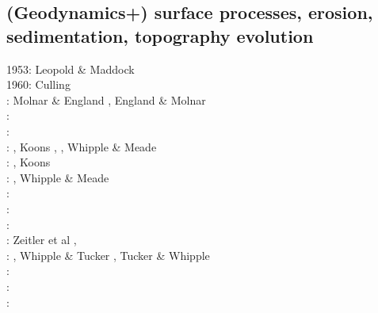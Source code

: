 \subsection{(Geodynamics+) surface processes, erosion, sedimentation, topography evolution}

\begin{scriptsize}
1953: Leopold \& Maddock \cite{lema53}\\
1960: Culling \cite{cull60}\\
\nineteenninety: Molnar \& England \cite{moen90}, England \& Molnar \cite{enmo90}\\
\nineteenninetytwo: \cite{befh92}\cite{chas92}\\
\nineteenninetythree: \cite{povp93}\cite{wibf93}\\
\nineteenninetyfour: \cite{howa94}, Koons \cite{koon94}, \cite{kobe94}\cite{gikb94}, 
                     Whipple \& Meade \cite{whme04}\\
\nineteenninetyfive: \cite{chmm95}, Koons \cite{koon95}\\
\nineteenninetysix: \cite{avbu96}\cite{bekh96}\cite{kobe96},
                     Whipple \& Meade \cite{whme06}\\
\nineteenninetyseven: \cite{brsa97}\cite{gaft97}\cite{babr97}\\
\nineteenninetyeight: \cite{deea98}\cite{vabr98}\\
\nineteenninetynine: \cite{will99a}\cite{bupi99}\cite{babr99}\cite{tobr99}\\
\twothousandone: Zeitler et al \cite{zemk01}, \cite{tulg01}\cite{brsh01}\cite{bupo01}\cite{coul01}\cite{crda01}\cite{moln01}\\
\twothousandtwo: \cite{wibr02}\cite{mobr02}\cite{garc02}, Whipple \& Tucker \cite{whtu02}, 
                 Tucker \& Whipple \cite{tuwh02}\\
\twothousandthree:    \cite{brau03}\\
\twothousandfour:     \cite{fijj04}\cite{gocl04}\cite{simp04}\cite{skdi04}\\
\twothousandfive:     \cite{lave05}\cite{will05}\cite{lahd05}\\

\end{scriptsize}
